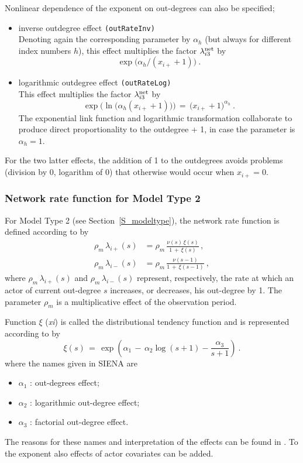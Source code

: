 \documentclass[a4paper,fleqn,11pt]{article}
\newcommand{\+}{\, + \,}
\newcommand{\SI}{{\sf SIENA }}
\begin{document}
\begin{enumerate}
 Nonlinear dependence of the exponent on out-degrees
 can also be specified;
 \begin{itemize}
 \item inverse outdegree effect  \texttt{(outRateInv)} \\
 Denoting again the corresponding parameter by $\alpha_h$
 (but always for different index numbers $h$),
 this effect multiplies the factor $\lambda^{\rm net}_{i3}$ by
 \[ \exp\big( \alpha_h / (x_{i+} +1)\big) \ . \]
 \item logarithmic outdegree effect  \texttt{(outRateLog)} \\
 This effect multiplies the factor $\lambda^{\rm net}_{i3}$ by
 \[ \exp\Big( \ln\big(\alpha_h (x_{i+} +1)\big)\Big) \,=\,
                 \big(x_{i+} +1\big)^{\alpha_h} \ . \]
 The exponential link function and logarithmic transformation collaborate
 to produce direct proportionality to the outdegree + 1, in case
 the parameter is $\alpha_h=1$.
 \end{itemize}
 For the two latter effects, the addition of 1 to the outdegrees avoids
 problems (division by 0, logarithm of 0) that otherwise would occur
 when $ x_{i+} = 0$.
\end{enumerate}

\iffalse
\subsubsection{Network rate function for Model Type 2}

For Model Type 2 (see Section~\ref{S_modeltype}), the network rate
function is defined according to \citet{Snijders03} by
\begin{align*}
  \rho_m\, \lambda_{i+}(s) & =
               \rho_m\,\frac{\nu(s)\, \xi(s)}{1 \,+\, \xi(s)}\, , \\
  \rho_m\, \lambda_{i-}(s) & =   \rho_m\, \frac{\nu(s-1)}{1 \,+\, \xi(s-1)} \ ,
\end{align*}
where $ \rho_m\,\lambda_{i+}(s)$ and $ \rho_m\,\lambda_{i-}(s)$
represent, respectively, the rate at which an actor of current
out-degree $s$ increases, or decreases, his out-degree by 1. The
parameter $\rho_m$ is a multiplicative effect of the observation
period.

Function $\xi$ (\emph{xi}) is called the distributional tendency
function and is represented according to \citet[formula (17)]{Snijders03} by
\[ \xi(s) \,=\, \exp\left(\alpha_1 \,-\, \alpha_2 \log(s+1) - \frac{\alpha_3}{s+1}\right)  \ . \]
where the names given in \SI are
\begin{itemize}
 \item $\alpha_1$ : out-degrees effect;
 \item $\alpha_2$ : logarithmic out-degree effect;
 \item $\alpha_3$ : factorial out-degree effect.
\end{itemize}
The reasons for these names and interpretation of the effects
can be found in \citet{Snijders03}.
To the exponent also effects of actor covariates can be added.
\end{document}

